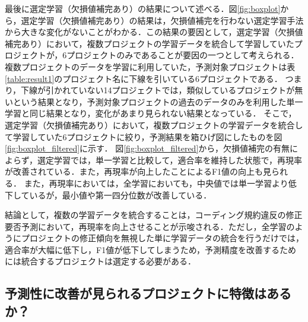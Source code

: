 \documentclass[paper]{ieicej}
\begin{document}
最後に選定学習（欠損値補完あり）の結果について述べる．図\ref{fig:boxplot}から，選定学習（欠損値補完あり）の結果は，欠損値補完を行わない選定学習手法から大きな変化がないことがわかる．この結果の要因として，選定学習（欠損値補完あり）において，複数プロジェクトの学習データを統合して学習していたプロジェクトが，6プロジェクトのみであることが要因の一つとして考えられる．
複数プロジェクトのデータを学習に利用していた，予測対象プロジェクトは表\ref{table:result1}のプロジェクト名に下線を引いている6プロジェクトである．
つまり，下線が引かれていない14プロジェクトでは，類似しているプロジェクトが無いという結果となり，予測対象プロジェクトの過去のデータのみを利用した単一学習と同じ結果となり，変化があまり見られない結果となっている．
そこで，選定学習（欠損値補完あり）において，複数プロジェクトの学習データを統合して学習していた6プロジェクトに絞り，予測結果を箱ひげ図にしたものを図\ref{fig:boxplot_filtered}に示す．
図\ref{fig:boxplot_filtered}から，欠損値補完の有無によらず，選定学習では，単一学習と比較して，適合率を維持した状態で，再現率が改善されている．また，再現率が向上したことによるF1値の向上も見られる．
また，再現率においては，全学習においても，中央値では単一学習より低下しているが，最小値や第一四分位数が改善している．

結論として，複数の学習データを統合することは，コーディング規約違反の修正要否予測において，再現率を向上させることが示唆される．ただし，全学習のようにプロジェクトの修正傾向を無視した単に学習データの統合を行うだけでは，適合率が大幅に低下し，F1値が低下してしまうため，予測精度を改善するためには統合するプロジェクトは選定する必要がある．

\subsection{予測性に改善が見られるプロジェクトに特徴はあるか？}
\end{document}
